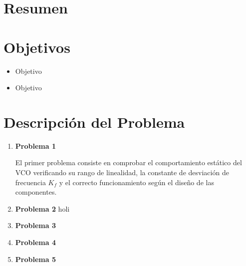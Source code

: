 \documentclass[letterpaper, titlepage]{article}
\begin{document}
\maketitle
\newpage
\section{Resumen}
\section{Objetivos}
	\begin{itemize}
		\item Objetivo
		\item Objetivo
	\end{itemize}
\newpage

\section{Descripción del Problema}
	\begin{enumerate}
		\item \textbf{Problema 1}
		
		El primer problema consiste en comprobar el comportamiento estático del VCO verificando su rango de linealidad, la constante de desviación de frecuencia $K_f$ y el correcto funcionamiento según el diseño de las componentes.
		\item \textbf{Problema 2}
		holi
		\item \textbf{Problema 3}
		
		\item \textbf{Problema 4}
		
		\item \textbf{Problema 5}
	\end{enumerate}
\newpage
\end{document}
